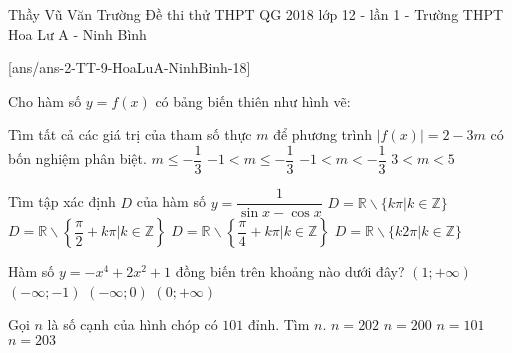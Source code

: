 
\begin{name}
{Thầy Vũ Văn Trường}
{Đề thi thử THPT QG 2018 lớp 12 - lần 1 - Trường THPT Hoa Lư A - Ninh Bình}
\end{name}
\setcounter{ex}{0}
[ans/ans-2-TT-9-HoaLuA-NinhBinh-18]
\begin{ex}%
 Cho hàm số $y=f(x)$ có bảng biến thiên như hình vẽ:
\begin{center}
\end{center}
 Tìm tất cả các giá trị của tham số thực $m$ để phương trình $|f(x)|=2-3m$ có bốn nghiệm phân biệt.
\choice
{$m\leq -\dfrac{1}{3}$}
{$-1< m\leq -\dfrac{1}{3}$}
{\True $-1< m<-\dfrac{1}{3}$}
{$3<m<5$}
\end{ex}
\begin{ex}%
Tìm tập xác định $D$ của hàm số $y=\dfrac{1}{\sin x-\cos x}$
\choice
{$D=\mathbb{R}\backslash \{k\pi | k\in \mathbb{Z}\}$}
{$D=\mathbb{R}\backslash \left\{\dfrac{\pi}{2}+k\pi | k\in \mathbb{Z}\right\}$}
{\True $D=\mathbb{R}\backslash \left\{\dfrac{\pi}{4}+k\pi | k\in \mathbb{Z}\right\}$}
{$D=\mathbb{R}\backslash \{k2\pi | k\in \mathbb{Z}\}$}
\end{ex}
\begin{ex}%
Hàm số $y=-x^4+2x^2+1$ đồng biến trên khoảng nào dưới đây?
\choice
{$(1;+\infty)$}
{\True $(-\infty;-1)$}
{$(-\infty;0)$}
{$(0;+\infty)$}
\end{ex}
\begin{ex}%
Gọi $n$ là số cạnh của hình chóp có $101$ đỉnh. Tìm $n$.
\choice
{$n=202$}
{\True $n=200$}
{$n=101$}
{$n=203$}
\end{ex}
\begin{ex}%
{
}
\end{ex}
